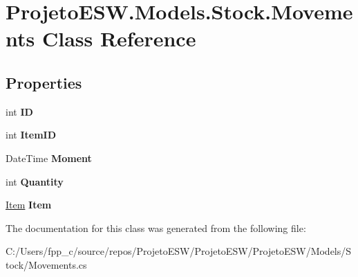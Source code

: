 \hypertarget{class_projeto_e_s_w_1_1_models_1_1_stock_1_1_movements}{}\section{Projeto\+E\+S\+W.\+Models.\+Stock.\+Movements Class Reference}
\label{class_projeto_e_s_w_1_1_models_1_1_stock_1_1_movements}
\subsection*{Properties}
\begin{DoxyCompactItemize}
\item 
\mbox{\label{class_projeto_e_s_w_1_1_models_1_1_stock_1_1_movements_a0d0acf697ca1edc0040c7db684e4cd88}} 
int {\bfseries ID}
\item 
\mbox{\label{class_projeto_e_s_w_1_1_models_1_1_stock_1_1_movements_a728dfb1a1fead51464a76605ac029212}} 
int {\bfseries Item\+ID}
\item 
\mbox{\label{class_projeto_e_s_w_1_1_models_1_1_stock_1_1_movements_a0847d297ca31df10d612c77c54ad9668}} 
Date\+Time {\bfseries Moment}
\item 
\mbox{\label{class_projeto_e_s_w_1_1_models_1_1_stock_1_1_movements_a2713c53985f7e69871be8ddb1bb3ffa3}} 
int {\bfseries Quantity}
\item 
\mbox{\label{class_projeto_e_s_w_1_1_models_1_1_stock_1_1_movements_a4352e288693d944881925f1dd0f85399}} 
\mbox{\hyperlink{class_projeto_e_s_w_1_1_models_1_1_stock_1_1_item}{Item}} {\bfseries Item}
\end{DoxyCompactItemize}


The documentation for this class was generated from the following file\+:\begin{DoxyCompactItemize}
\item 
C\+:/\+Users/fpp\+\_\+c/source/repos/\+Projeto\+E\+S\+W/\+Projeto\+E\+S\+W/\+Projeto\+E\+S\+W/\+Models/\+Stock/Movements.\+cs\end{DoxyCompactItemize}
